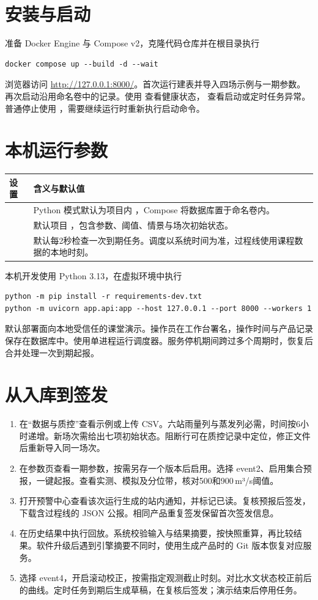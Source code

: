 
\section{安装与启动}
准备 Docker Engine 与 Compose v2，克隆代码仓库并在根目录执行
\begin{verbatim}
docker compose up --build -d --wait
\end{verbatim}
浏览器访问 \url{http://127.0.0.1:8000/}。首次运行建表并导入四场示例与一期参数。再次启动沿用命名卷中的记录。使用  查看健康状态， 查看启动或定时任务异常。普通停止使用 ，需要继续运行时重新执行启动命令。
\section{本机运行参数}
\noindent\begin{tabularx}{\linewidth}{@{}lL@{}}\toprule 设置 & 含义与默认值\\\midrule
{} & Python 模式默认为项目内 ，Compose 将数据库置于命名卷内。\\
 & 默认项目 ，包含参数、阈值、情景与场次初始状态。\\
 & 默认每2秒检查一次到期任务。调度以系统时间为准，过程线使用课程数据的本地时刻。\\\bottomrule\end{tabularx}
\par 本机开发使用 Python 3.13，在虚拟环境中执行
\begin{verbatim}
python -m pip install -r requirements-dev.txt
python -m uvicorn app.api:app --host 127.0.0.1 --port 8000 --workers 1
\end{verbatim}
默认部署面向本地受信任的课堂演示。操作员在工作台署名，操作时间与产品记录保存在数据库中。使用单进程运行调度器。服务停机期间跨过多个周期时，恢复后合并处理一次到期起报。
\section{从入库到签发}
\begin{enumerate}
\item 在“数据与质控”查看示例或上传 CSV。六站雨量列与蒸发列必需，时间按6小时递增。新场次需给出七项初始状态。阻断行可在质控记录中定位，修正文件后重新导入同一场次。
\item 在参数页查看一期参数，按需另存一个版本后启用。选择 event2、启用集合预报，一键起报。查看实测、模拟及分位带，核对500和900\,m³/s阈值。
\item 打开预警中心查看该次运行生成的站内通知，并标记已读。复核预报后签发，下载含过程线的 JSON 公报。相同产品重复签发保留首次签发信息。
\item 在历史结果中执行回放。系统校验输入与结果摘要，按快照重算，再比较结果。软件升级后遇到引擎摘要不同时，使用生成产品时的 Git 版本恢复对应服务。
\item 选择 event4，开启滚动校正，按需指定观测截止时刻。对比水文状态校正前后的曲线。定时任务到期后生成草稿，在复核后签发；演示结束后停用任务。
\end{enumerate}
